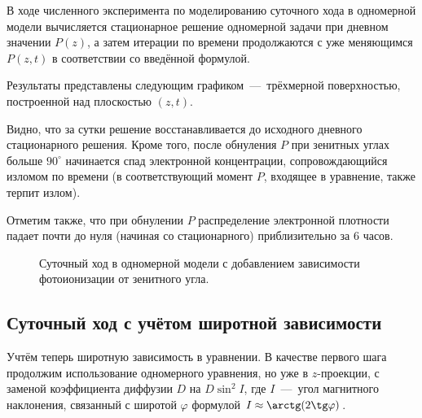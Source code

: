 \documentclass[14pt, a4paper, fleqn]{extarticle}
\begin{document}
В ходе численного эксперимента по моделированию суточного хода в одномерной модели вычисляется стационарное решение одномерной задачи при дневном значении $P(z)$, а затем итерации по времени продолжаются с уже меняющимся $P(z, t)$ в соответствии со введённой формулой.

Результаты представлены следующим графиком~---~трёхмерной поверхностью, построенной над плоскостью $(z, t)$.

Видно, что за сутки решение восстанавливается до исходного дневного стационарного решения. Кроме того, после обнуления $P$ при зенитных углах больше $90^\circ$ начинается спад электронной концентрации, сопровождающийся изломом по времени (в соответствующий  момент $P$, входящее в уравнение, также терпит излом).

Отметим также, что при обнулении $P$ распределение электронной плотности падает почти до нуля (начиная со стационарного)  приблизительно за $6$ часов.

\begin{figure}[H]
\caption{Суточный ход в одномерной модели с добавлением зависимости фотоионизации от зенитного угла.}
\end{figure}

\subsection{Суточный ход с учётом широтной зависимости}


Учтём теперь широтную зависимость в уравнении. В качестве первого шага продолжим использование одномерного уравнения, но уже в $z$-проекции, с заменой коэффициента диффузии $D$ на $D\sin^2I$, где $I$~---~угол магнитного наклонения, связанный с широтой $\varphi$ формулой $I\approx \arctg(2\tg \varphi)$.
\end{document}
